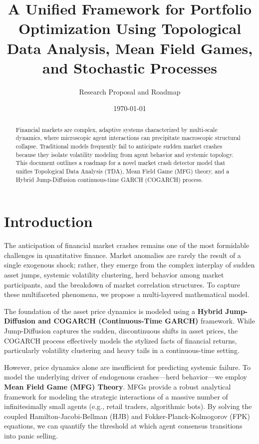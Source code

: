 \documentclass[11pt, a4paper]{article}
\title{\textbf{A Unified Framework for Portfolio Optimization Using Topological Data Analysis, Mean Field Games, and Stochastic Processes}}
\author{Research Proposal and Roadmap}
\date{\today}
\begin{document}
\maketitle

\begin{abstract}
Financial markets are complex, adaptive systems characterized by multi-scale dynamics, where microscopic agent interactions can precipitate macroscopic structural collapse. Traditional models frequently fail to anticipate sudden market crashes because they isolate volatility modeling from agent behavior and systemic topology. This document outlines a roadmap for a novel market crash detector model that unifies Topological Data Analysis (TDA), Mean Field Game (MFG) theory, and a Hybrid Jump-Diffusion continuous-time GARCH (COGARCH) process. 
\end{abstract}

\section{Introduction}

The anticipation of financial market crashes remains one of the most formidable challenges in quantitative finance. Market anomalies are rarely the result of a single exogenous shock; rather, they emerge from the complex interplay of sudden asset jumps, systemic volatility clustering, herd behavior among market participants, and the breakdown of market correlation structures. To capture these multifaceted phenomena, we propose a multi-layered mathematical model.

The foundation of the asset price dynamics is modeled using a \textbf{Hybrid Jump-Diffusion and COGARCH (Continuous-Time GARCH)} framework. While Jump-Diffusion captures the sudden, discontinuous shifts in asset prices, the COGARCH process effectively models the stylized facts of financial returns, particularly volatility clustering and heavy tails in a continuous-time setting. 

However, price dynamics alone are insufficient for predicting systemic failure. To model the underlying driver of endogenous crashes---herd behavior---we employ \textbf{Mean Field Game (MFG) Theory}. MFGs provide a robust analytical framework for modeling the strategic interactions of a massive number of infinitesimally small agents (e.g., retail traders, algorithmic bots). By solving the coupled Hamilton-Jacobi-Bellman (HJB) and Fokker-Planck-Kolmogorov (FPK) equations, we can quantify the threshold at which agent consensus transitions into panic selling.
\end{document}
